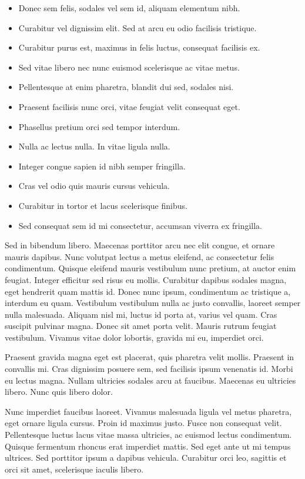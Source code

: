 \documentclass[
]{book}
\providecommand{\tightlist}{%
  \setlength{\itemsep}{0pt}\setlength{\parskip}{0pt}}
\begin{document}
\begin{itemize}
\tightlist
\item
  Donec sem felis, sodales vel sem id, aliquam elementum nibh.
\item
  Curabitur vel dignissim elit. Sed at arcu eu odio facilisis tristique.
\item
  Curabitur purus est, maximus in felis luctus, consequat facilisis ex.
\item
  Sed vitae libero nec nunc euismod scelerisque ac vitae metus.
\item
  Pellentesque at enim pharetra, blandit dui sed, sodales nisi.
\item
  Praesent facilisis nunc orci, vitae feugiat velit consequat eget.
\item
  Phasellus pretium orci sed tempor interdum.
\item
  Nulla ac lectus nulla. In vitae ligula nulla.
\item
  Integer congue sapien id nibh semper fringilla.
\item
  Cras vel odio quis mauris cursus vehicula.
\item
  Curabitur in tortor et lacus scelerisque finibus.
\item
  Sed consequat sem id mi consectetur, accumsan viverra ex fringilla.
\end{itemize}

Sed in bibendum libero. Maecenas porttitor arcu nec elit congue, et ornare mauris dapibus. Nunc volutpat lectus a metus eleifend, ac consectetur felis condimentum. Quisque eleifend mauris vestibulum nunc pretium, at auctor enim feugiat. Integer efficitur sed risus eu mollis. Curabitur dapibus sodales magna, eget hendrerit quam mattis id. Donec nunc ipsum, condimentum ac tristique a, interdum eu quam. Vestibulum vestibulum nulla ac justo convallis, laoreet semper nulla malesuada. Aliquam nisl mi, luctus id porta at, varius vel quam. Cras suscipit pulvinar magna. Donec sit amet porta velit. Mauris rutrum feugiat vestibulum. Vivamus vitae dolor lobortis, gravida mi eu, imperdiet orci.

Praesent gravida magna eget est placerat, quis pharetra velit mollis. Praesent in convallis mi. Cras dignissim posuere sem, sed facilisis ipsum venenatis id. Morbi eu lectus magna. Nullam ultricies sodales arcu at faucibus. Maecenas eu ultricies libero. Nunc quis libero dolor.

Nunc imperdiet faucibus laoreet. Vivamus malesuada ligula vel metus pharetra, eget ornare ligula cursus. Proin id maximus justo. Fusce non consequat velit. Pellentesque luctus lacus vitae massa ultricies, ac euismod lectus condimentum. Quisque fermentum rhoncus erat imperdiet mattis. Sed eget ante ut mi tempus ultrices. Sed porttitor ipsum a dapibus vehicula. Curabitur orci leo, sagittis et orci sit amet, scelerisque iaculis libero.
\end{document}
